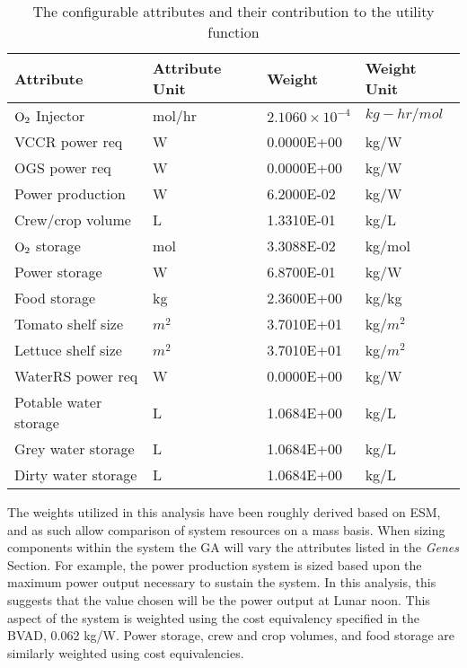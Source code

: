 \documentclass[submit]{aiaa}
\begin{document}
\begin{table}
\begin{center}
\begin{tabular}{|l|l|l|l|}  \hline
Attribute & Attribute Unit & Weight & Weight Unit\\ \hline\hline
${\rm O}_2$ Injector & mol/hr & $2.1060 \times 10^{-4}$ & $kg-hr/mol$ \\ \hline
VCCR power req & W & 0.0000E+00 & kg/W \\ \hline
OGS power req & W & 0.0000E+00 & kg/W \\ \hline
Power production & W & 6.2000E-02 & kg/W \\ \hline
Crew/crop volume & L & 1.3310E-01 & kg/L \\ \hline
${\rm O}_2$ storage & mol & 3.3088E-02 & kg/mol \\ \hline
Power storage & W & 6.8700E-01 & kg/W \\ \hline
Food storage & kg & 2.3600E+00 & kg/kg \\ \hline
Tomato shelf size & $m^2$ & 3.7010E+01 & kg/$m^2$ \\ \hline
Lettuce shelf size & $m^2$ & 3.7010E+01 & kg/$m^2$ \\ \hline
WaterRS power req & W & 0.0000E+00 & kg/W \\ \hline
Potable water storage & L & 1.0684E+00 & kg/L \\ \hline
Grey water storage & L & 1.0684E+00 & kg/L \\ \hline
Dirty water storage & L & 1.0684E+00 & kg/L \\ \hline
\end{tabular}
\end{center}
\caption{The configurable attributes and their contribution to the
  utility function} 
\label{tab:weights}
\end{table}

The weights utilized in this analysis have been roughly derived based on ESM, and as such allow comparison of system resources on a mass basis. 
When sizing components within the system the GA will vary the
attributes listed in the \emph{Genes} Section.%
For example, the power
production system is sized based upon the maximum power output
necessary to sustain the system. In this analysis, this suggests that
the value chosen will be the power output at Lunar noon. This aspect
of the system is weighted using the cost equivalency specified in the
BVAD, 0.062 kg/W\cite{bvad04}. 
Power storage, crew and crop volumes, and food storage are similarly
weighted using cost equivalencies\cite{bvad04}.
\end{document}
